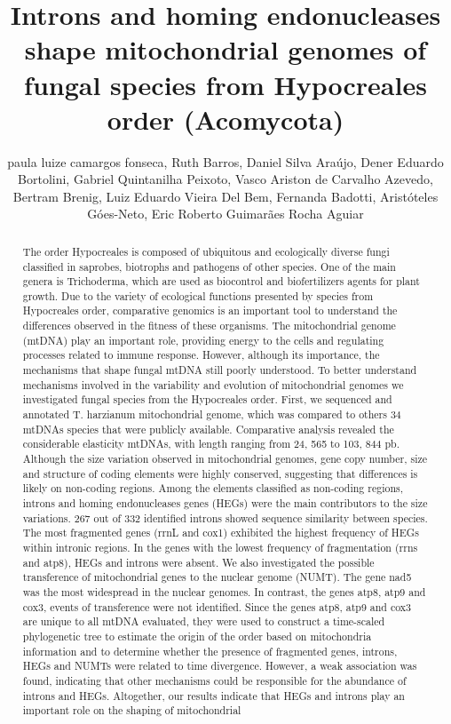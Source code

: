 \documentclass[twoside]{article}
\title{\vspace{-15mm}\fontsize{24pt}{10pt}\selectfont\textbf{ Introns and homing endonucleases shape mitochondrial genomes of fungal species from Hypocreales order (Acomycota) }} %
\author{ paula  luize camargos fonseca, Ruth Barros, Daniel Silva Ara\'ujo, Dener Eduardo Bortolini, Gabriel Quintanilha Peixoto, Vasco Ariston de Carvalho Azevedo, Bertram Brenig, Luiz Eduardo Vieira Del Bem, Fernanda Badotti, Arist\'oteles G\'oes-Neto, Eric Roberto Guimar\~aes Rocha Aguiar }
\affil{ University G\"ottingen }
\date{}
\begin{document}
  
  
  \maketitle %
  
  
  \thispagestyle{fancy} %
  
  
  \begin{abstract}
  The order Hypocreales is composed of ubiquitous and ecologically diverse fungi classified in saprobes,  biotrophs and pathogens of other species. One of the main genera is Trichoderma,  which are used as biocontrol and biofertilizers agents for plant growth. Due to the variety of ecological functions presented by species from Hypocreales order,  comparative genomics is an important tool to understand the differences observed in the fitness of these organisms. The mitochondrial genome (mtDNA) play an important role,  providing energy to the cells and regulating processes related to immune response. However,  although its importance,  the mechanisms that shape fungal mtDNA still poorly understood. To better understand mechanisms involved in the variability and evolution of mitochondrial genomes we investigated fungal species from the Hypocreales order. First,  we sequenced and annotated T. harzianum mitochondrial genome,  which was compared to others 34 mtDNAs species that were publicly available. Comparative analysis revealed the considerable elasticity mtDNAs,  with length ranging from 24, 565 to 103, 844 pb. Although the size variation observed in mitochondrial genomes,  gene copy number,  size and structure of coding elements were highly conserved,  suggesting that differences is likely on non-coding regions. Among the elements classified as non-coding regions,  introns and homing endonucleases genes (HEGs) were the main contributors to the size variations. 267 out of 332 identified introns showed sequence similarity between species. The most fragmented genes (rrnL and cox1) exhibited the highest frequency of HEGs within intronic regions. In the genes with the lowest frequency of fragmentation (rrns and atp8),  HEGs and introns were absent. We also investigated the possible transference of mitochondrial genes to the nuclear genome (NUMT). The gene nad5 was the most widespread in the nuclear genomes. In contrast,  the genes atp8,  atp9 and cox3,  events of transference were not identified. Since the genes atp8,  atp9 and cox3 are unique to all mtDNA evaluated,  they were used to construct a time-scaled phylogenetic tree to estimate the origin of the order based on mitochondria information and to determine whether the presence of fragmented genes,  introns,  HEGs and NUMTs were related to time divergence. However,  a weak association was found,  indicating that other mechanisms could be responsible for the abundance of introns and HEGs. Altogether,  our results indicate that HEGs and introns play an important role on the shaping of mitochondrial 
\end{abstract}
\end{document}
